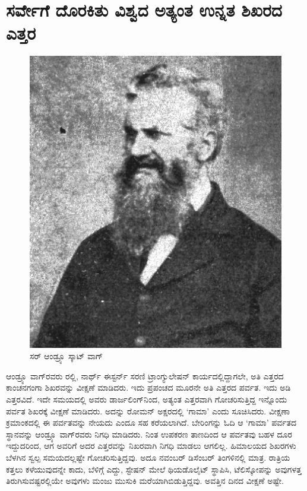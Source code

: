 
\chapter{ಸರ್ವೇಗೆ ದೊರಕಿತು ವಿಶ್ವದ ಅತ್ಯಂತ ಉನ್ನತ ಶಿಖರದ ಎತ್ತರ}

\vskip -12pt

\begin{figure}[!hbtp]
\includegraphics[scale=1.1]{"images/image021.jpg"}
\caption{ಸರ್ ಆಂಡ್ರ್ಯೂ ಸ್ಕಾಟ್‌ ವಾಗ್​}\label{chap15-fig1}
\end{figure}

ಆಂಡ್ರ್ಯೂ ವಾಗ್​ರವರು ರಲ್ಲಿ, ನಾರ್ಥ್ ಈಸ್ಟರ್ನ್ ಸರಣಿ ಟ್ರಾಂಗ್ಯುಲೇಷನ್​ ಕಾರ್ಯದಲ್ಲಿದ್ದಾಗಲೇ, ಅತಿ ಎತ್ತರದ ಕಾಂಚನಗಂಗಾ ಶಿಖರವನ್ನು ವೀಕ್ಷಣೆ ಮಾಡಿದರು. ಇದು ಪ್ರಪಂಚದ ಮೂರನೇ ಅತಿ ಎತ್ತರದ ಪರ್ವತ. ಇದು  ಅಡಿ ಎತ್ತರವಿದೆ. ಇದೇ ಸಮಯದಲ್ಲಿ ಅವರು ಡಾರ್ಜಲಿಂಗ್​ನಿಂದ, ಅತ್ಯಂತ ಎತ್ತರವಾಗಿ ಗೋಚರಿಸುತ್ತಿದ್ದ ಇನ್ನೊಂದು ಪರ್ವತ ಶಿಖರಕ್ಕೆ ವೀಕ್ಷಣೆ ಮಾಡಿದರು. ಅದನ್ನು ರೋಮನ್​ ಅಕ್ಷರದಲ್ಲಿ ‘ಗಾಮಾ’ ಎಂದು ಸೂಚಿಸಿದರು. ವೀಕ್ಷಣಾ ಕ್ರಮಾಂಕದಲ್ಲಿ ಈ ಪರ್ವತವನ್ನು ನೇಯದು ಎಂದೂ ಸಹ ಕರೆಯಲಾಗಿದೆ. ಬೇರಿಂಗನ್ನು ಓದಿ ಆ ‘ಗಾಮಾ’ ಪರ್ವತದ ಸ್ಥಾನವನ್ನು ಆಂಡ್ರ್ಯೂ ವಾಗ್​ರವರು ನಿಗಧಿ ಮಾಡಿದರು. ನಿಂತ ಉಪಕರಣ ತಾಣದಿಂದ ಆ ಪರ್ವತವು ಬಹಳ ದೂರ ಇದ್ದುದರಿಂದ, ಆಗ ಅವರಿಗೆ ಅದರ ಎತ್ತರವನ್ನು ನಿಖರವಾಗಿ ನಿಗಧಿ ಮಾಡಲು ಆಗಲಿಲ್ಲ. ಹಿಮಾಲಯದ ಶಿಖರಗಳು ಬೆಳಗಿನ ಸ್ವಲ್ಪ ಸಮಯದಲ್ಲಷ್ಟೇ ಗೋಚರಿಸುತ್ತಿದ್ದವು. ಅದೂ ನವಂಬರ್​ ಡಿಸೆಂಬರ್​ ತಿಂಗಳಿನಲ್ಲಿ ಮಾತ್ರ. ರಾತ್ರಿಯ ಕತ್ತಲು ಕಳೆಯುವುದನ್ನೇ ಕಾದು, ಬೆಳಿಗ್ಗೆ ಎದ್ದು, ಸ್ಟೇಷನ್​ ಮೇಲೆ ಥಿಯಡೊಲೈಟ್​ ಸ್ಥಾಪಿಸಿ, ಟೆಲಿಸ್ಕೋಪನ್ನು ಅವುಗಳತ್ತ ತಿರುಗಿಸುವಷ್ಟರಲ್ಲಿಯೇ ಅವುಗಳು ಮಂಜು ಮುಸುಕಿ ಮರೆಯಾಗಿಬಿಡುತ್ತಿದ್ದವು. ಅವತ್ತಿನ ದಿನದ ವೀಕ್ಷಣೆ ಅಷ್ಟೇ.

